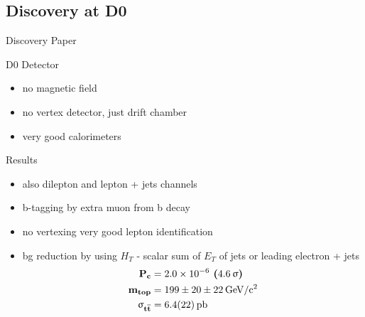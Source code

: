 \subsection{Discovery at D0}
\begin{frame}{Discovery Paper}
	
	
\end{frame}
\begin{frame}{D0 Detector}
	
	
	\begin{itemize}\itemfill
		\item no magnetic field
		\item no vertex detector, just drift chamber
		\item very good calorimeters
	\end{itemize}
	
\end{frame}
\begin{frame}{Results}
	
	\begin{itemize}\itemfill
		\item also dilepton and lepton + jets channels
		\item b-tagging by extra muon from b decay
		\item no vertexing \ra very good lepton identification
		\item bg reduction by using $H_{T}$ - scalar sum of $E_{T}$ of jets or leading electron + jets
		{\begin{align*} 
			\z{\textbf{P}}_{\z{\textbf{c}}} 	&= \textbf{\SI{2.0e-6}{} (\SI{4.6}{\upsigma})}\\
			\z{\textbf{m}}_{\z{\textbf{top}}} 	&= \textbf{\SI[parse-numbers=false]{199\pm20\pm22}{\giga\electronvolt\per c^2}}\\
			\mathbf{\upsigma}_{\z{\textbf{t}}\overline{\z{\textbf{t}}}} &= \textbf{\SI{6.4\pm2.2}{\pico\barn}}
		\end{align*}}
	\end{itemize}
	
	\vspace*{-12pt}
	
\end{frame}

